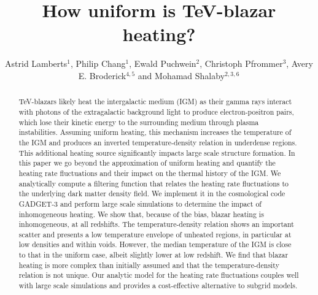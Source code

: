 \documentclass[numberedappendix]{emulateapj}
\begin{document}
\title{How uniform is TeV-blazar heating?}
\author{Astrid Lamberts$^1$, Philip Chang$^1$, Ewald Puchwein$^2$, Christoph Pfrommer$^3$, Avery E. Broderick$^{4,5}$ and Mohamad Shalaby$^{2,3,6}$}
\begin{abstract}
TeV-blazars likely heat the intergalactic medium (IGM) as their gamma rays interact with photons of the extragalactic background light to produce electron-positron pairs, which lose their kinetic energy to the surrounding medium through plasma instabilities. Assuming uniform heating, this mechanism increases the temperature of the IGM and produces an inverted temperature-density relation in underdense regions. This additional heating source significantly impacts large scale structure formation. In this paper we go beyond the approximation of uniform heating and quantify the heating rate fluctuations and their impact on the thermal history of the IGM. We analytically compute a filtering function that relates the heating rate fluctuations to the underlying dark matter density field. We implement it in the cosmological code GADGET-3 and perform large scale simulations to determine the impact of inhomogeneous heating. We show that, because of the bias, blazar heating is inhomogeneous, at all redshifts. The temperature-density relation shows an important scatter and presents a low temperature envelope of unheated regions, in particular at low densities and within voids. However, the median temperature of the IGM is close to that in the uniform case, albeit slightly lower at low redshift. We find that blazar heating is more complex than initially assumed and that the temperature-density relation is not unique. Our analytic model for the heating rate fluctuations couples well with large scale simulations and provides a cost-effective alternative to subgrid models.
\end{abstract}
\end{document}
